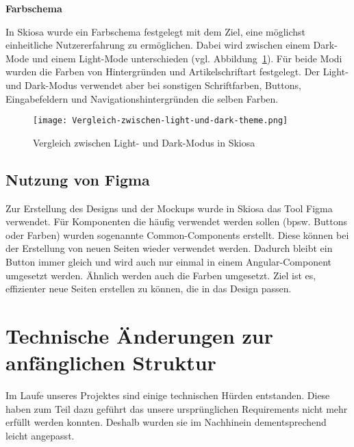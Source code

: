 \textbf{Farbschema}

In Skiosa wurde ein Farbschema festgelegt mit dem Ziel, 
eine möglichst einheitliche Nutzererfahrung zu ermöglichen. 
Dabei wird zwischen einem Dark-Mode und einem Light-Mode unterschieden (vgl. Abbildung~\ref{fig:Vergleich-light-dark}).
Für beide Modi wurden die Farben von Hintergründen und Artikelschriftart festgelegt.
Der Light- und Dark-Modus verwendet 
aber bei sonstigen Schriftfarben, Buttons, Eingabefeldern und Navigationshintergründen die selben Farben.

\begin{figure}[h]
    \texttt{[image: Vergleich-zwischen-light-und-dark-theme.png]}
    \caption{Vergleich zwischen Light- und Dark-Modus in Skiosa}
    \label{fig:Vergleich-light-dark}
\end{figure}

\subsection{Nutzung von Figma}

Zur Erstellung des Designs und der Mockups wurde in Skiosa das Tool Figma verwendet. 
Für Komponenten die häufig verwendet werden sollen (bpsw. Buttons oder Farben) wurden sogenannte Common-Components erstellt.
Diese können bei der Erstellung von neuen Seiten wieder verwendet werden. 
Dadurch bleibt ein Button immer gleich und wird auch nur einmal in einem Angular-Component umgesetzt werden.
Ähnlich werden auch die Farben umgesetzt. 
Ziel ist es, effizienter neue Seiten erstellen zu können, die in das Design passen. 

\section{Technische Änderungen zur anfänglichen Struktur} \label{tech_changes}
Im Laufe unseres Projektes sind einige technischen Hürden entstanden. Diese haben zum Teil dazu geführt das unsere ursprünglichen Requirements nicht mehr erfüllt werden konnten.
Deshalb wurden sie im Nachhinein dementsprechend leicht angepasst.

\begin{table}[h]
\caption{Tabelle – Änderungen zur anfänglichen Struktur}
\end{table}

